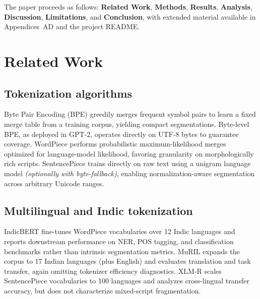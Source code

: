 \documentclass{article}
\begin{document}
The paper proceeds as follows: \textbf{Related Work}, \textbf{Methods}, \textbf{Results}, \textbf{Analysis}, \textbf{Discussion}, \textbf{Limitations}, and \textbf{Conclusion}, with extended material available in Appendices~A\textendash{}D and the project README.\@


\section{Related Work}

\subsection{Tokenization algorithms}
Byte Pair Encoding (BPE) greedily merges frequent symbol pairs to learn a fixed merge table from a training corpus, yielding compact segmentations\cite{Sennrich2016BPE}. Byte-level BPE, as deployed in GPT-2, operates directly on UTF-8 bytes to guarantee coverage\cite{Radford2019GPT2}. WordPiece performs probabilistic maximum-likelihood merges optimized for language-model likelihood, favoring granularity on morphologically rich scripts\cite{Schuster2012WordPiece}. SentencePiece trains directly on raw text using a unigram language model \emph{(optionally with byte-fallback)}, enabling normalization-aware segmentation across arbitrary Unicode ranges\cite{Kudo2018SentencePiece}.

\subsection{Multilingual and Indic tokenization}
IndicBERT fine-tunes WordPiece vocabularies over 12 Indic languages and reports downstream performance on NER, POS tagging, and classification benchmarks rather than intrinsic segmentation metrics\cite{Kakwani2020IndicBERT}. MuRIL expands the corpus to 17 Indian languages (plus English) and evaluates translation and task transfer, again omitting tokenizer efficiency diagnostics\cite{Khanuja2021MuRIL}. XLM-R scales SentencePiece vocabularies to 100 languages and analyzes cross-lingual transfer accuracy, but does not characterize mixed-script fragmentation\cite{Conneau2020XLMR}.
\end{document}
